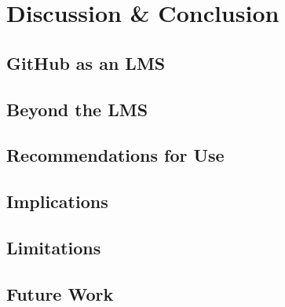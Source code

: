 \chapter{Discussion \& Conclusion}

\section{GitHub as an LMS}

\section{Beyond the LMS}

\section{Recommendations for Use}

\section{Implications}

\section{Limitations}

\section{Future Work}
